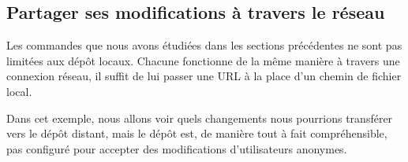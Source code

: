 \subsection{Partager ses modifications à travers le réseau}

Les commandes que nous avons étudiées dans les sections précédentes
ne sont pas limitées aux dépôt locaux. Chacune fonctionne de la même
manière à travers une connexion réseau, il suffit de lui passer une 
URL à la place d'un chemin de fichier local.

Dans cet exemple, nous allons voir quels changements nous pourrions
transférer vers le dépôt distant, mais le dépôt est, de manière tout
à fait compréhensible, pas configuré pour accepter des modifications
d'utilisateurs anonymes.

